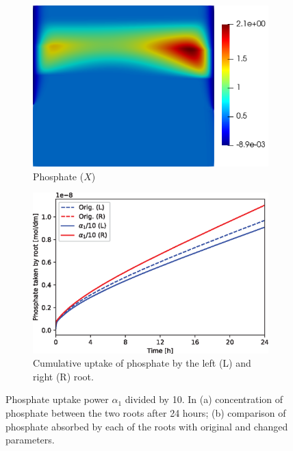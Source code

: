 \documentclass[11pt]{article}
\numberwithin{equation}{section}
\begin{document}
\begin{figure}[!htb]
\centering
\begin{subfigure}[t]{0.35\textwidth}
    \includegraphics[width=\textwidth]{Figures/X_alpha1divby10.png}
    \caption{Phosphate ($X$)}
    \label{fig:numexp_a1_down1}
\end{subfigure}
\hspace{1cm}
\begin{subfigure}[t]{0.45\textwidth}
    \includegraphics[width=\textwidth]{Figures/alpha1divby10.eps}
    \caption{Cumulative uptake of phosphate by the left (L) and right (R) root.}
    \label{fig:numexp_a1_down2}
\end{subfigure}

\caption{Phosphate uptake power $\alpha_1$ divided by 10. In (a) concentration of phosphate between the two roots after 24 hours; (b) comparison of phosphate absorbed by each of the roots with original and changed parameters.}
\label{fig:numexp_a1_down}
\end{figure}
\end{document}

